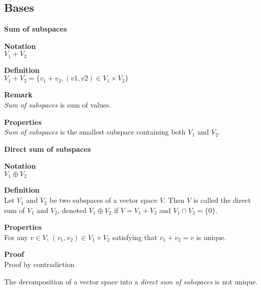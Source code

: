 \documentclass{article}
\begin{document}
\subsection{Bases}

\begin{framed}

    \textbf{Sum of subspaces}

    \begin{framed}
        \textbf{Notation}\\
        $V_{1}+V_{2}$
    \end{framed}

    \begin{framed}
        \textbf{Definition}\\
        $V_{1}+V_{2}=\{v_{1}+v_{2},(v1,v2)\in V_{1}\times V_{2}\}$
        \begin{framed}
        \textbf{Remark}\\
        \textit{Sum of subspaces} is sum of values.
        \end{framed}
    \end{framed}

    \begin{framed}
        \textbf{Properties}\\
        \textit{Sum of subspaces} is the smallest subspace containing both $V_{1}$ and $V_{2}$.
    \end{framed}

\end{framed}

\begin{framed}

    \textbf{Direct sum of subspaces}

    \begin{framed}
        \textbf{Notation}\\
        $V_{1}\oplus V_{2}$
    \end{framed}

    \begin{framed}
        \textbf{Definition}\\
        Let $V_{1}$ and $V_{2}$ be two subspaces of a vector space $V$. Then $V$ is called the direct sum of $V_{1}$ and $V_{2}$, denoted $V_{1} \oplus V_{2}$ if $V = V_{1}+V_{2}$ and $V_{1}\cap V_{2} = \{0\}$.
    \end{framed}

    \begin{framed}
        \textbf{Properties}\\
        For any $v\in V$, $(v_{1},v_{2})\in V_{1}\times V_{2}$ satisfying that $v_{1}+v_{2}=v$ is unique.
        \begin{framed}
            \textbf{Proof}\\
            Proof by contradiction
        \end{framed}
        The decomposition of a vector space into a \textit{direct sum of subspaces} is not unique.
    \end{framed}

\end{framed}
\end{document}
